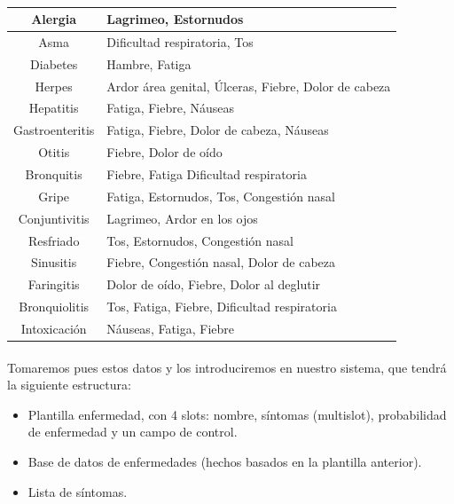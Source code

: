 \documentclass{article}
\begin{document}
    \paragraph{}
    \begin{tabular}{|c|l|}
    \hline
    Alergia & Lagrimeo, Estornudos
    \\ \hline
    Asma & Dificultad respiratoria, Tos
    \\ \hline
    Diabetes & Hambre, Fatiga
    \\ \hline
    Herpes & Ardor área genital, Úlceras, Fiebre, Dolor de cabeza
    \\ \hline
    Hepatitis & Fatiga, Fiebre, Náuseas
    \\ \hline
    Gastroenteritis & Fatiga, Fiebre, Dolor de cabeza, Náuseas
    \\ \hline
    Otitis & Fiebre, Dolor de oído
    \\ \hline
    Bronquitis & Fiebre, Fatiga Dificultad respiratoria
    \\ \hline
    Gripe & Fatiga, Estornudos, Tos, Congestión nasal
    \\ \hline
    Conjuntivitis & Lagrimeo, Ardor en los ojos
    \\ \hline
    Resfriado & Tos, Estornudos, Congestión nasal
    \\ \hline
    Sinusitis & Fiebre, Congestión nasal, Dolor de cabeza
    \\ \hline
    Faringitis & Dolor de oído, Fiebre, Dolor al deglutir
    \\ \hline
    Bronquiolitis & Tos, Fatiga, Fiebre, Dificultad respiratoria 
    \\ \hline
    Intoxicación & Náuseas, Fatiga, Fiebre
    \\ \hline
        
    \end{tabular}
    \paragraph{}
    Tomaremos pues estos datos y los introduciremos en nuestro sistema, que tendrá la siguiente estructura:
    \begin{itemize}
        \item Plantilla enfermedad, con 4 slots: nombre, síntomas (multislot), probabilidad de enfermedad y un campo de control.
        \item Base de datos de enfermedades (hechos basados en la plantilla anterior).
        \item Lista de síntomas.
    \end{itemize}
    \pagebreak
\end{document}

